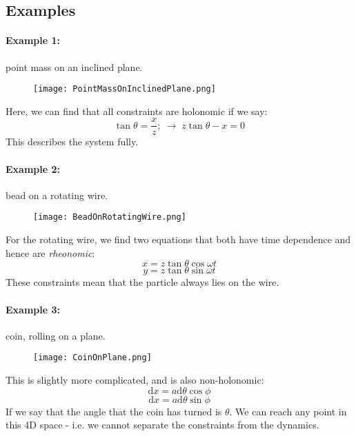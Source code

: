 \subsection{Examples}
\paragraph{Example 1:} point mass on an inclined plane.
\begin{figure}[!htb]
	\centering
	\texttt{[image: PointMassOnInclinedPlane.png]}
\end{figure}
Here, we can find that all constraints are holonomic if we say:
$$
	\tan\theta = \frac{x}{z} ;\ \rightarrow \;
	z\tan\theta - x = 0
$$
This describes the system fully.

\paragraph{Example 2:} bead on a rotating wire.
\begin{figure}[!htb]
    \centering
	\texttt{[image: BeadOnRotatingWire.png]}
\end{figure}
For the rotating wire, we find two equations that both have time dependence and
hence are \emph{rheonomic}:
$$
	x = z\tan\theta\cos\omega t
$$
$$
	y = z\tan\theta\sin\omega t
$$
These constraints mean that the particle always lies on the wire.

\paragraph{Example 3:} coin, rolling on a plane.
\begin{figure}[!htb]
	\centering
	\texttt{[image: CoinOnPlane.png]}
\end{figure}
This is slightly more complicated, and is also non-holonomic:
$$
	\mathrm{d}x = a\mathrm{d}\theta \cos \phi
$$
$$
	\mathrm{d}x = a\mathrm{d}\theta \sin \phi
$$
If we say that the angle that the coin has turned is $\theta$. We can reach any
point in this 4D space - i.e. we cannot separate the constraints from the
dynamics.

